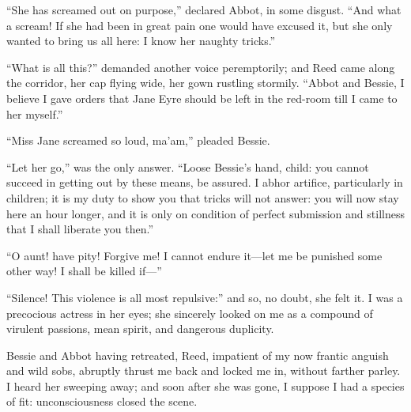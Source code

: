 \enquote{She has screamed out on purpose,} declared Abbot, in some
disgust.  \enquote{And what a scream!  If she had been in great pain one
would have excused it, but she only wanted to bring us all here: I know
her naughty tricks.}

\enquote{What is all this?} demanded another voice peremptorily; and
\Mrs{} Reed came along the corridor, her cap flying wide, her gown
rustling stormily.  \enquote{Abbot and Bessie, I believe I gave orders
that Jane Eyre should be left in the red-room till I came to her
myself.}

\enquote{Miss Jane screamed so loud, ma'am,} pleaded Bessie.

\enquote{Let her go,} was the only answer.  \enquote{Loose Bessie's
hand, child: you cannot succeed in getting out by these means, be
assured.  I abhor artifice, particularly in children; it is my duty to
show you that tricks will not answer: you will now stay here an hour
longer, and it is only on condition of perfect submission and stillness
that I shall liberate you then.}

\enquote{O aunt! have pity!  Forgive me!  I cannot endure it---let me be
punished some other way!  I shall be killed if---}

\enquote{Silence!  This violence is all most repulsive:} and so, no
doubt, she felt it.  I was a precocious actress in her eyes; she
sincerely looked on me as a compound of virulent passions, mean spirit,
and dangerous duplicity.

Bessie and Abbot having retreated, \Mrs{} Reed, impatient of my now
frantic anguish and wild sobs, abruptly thrust me back and locked me in,
without farther parley.  I heard her sweeping away; and soon after she
was gone, I suppose I had a species of fit: unconsciousness closed the
scene.
